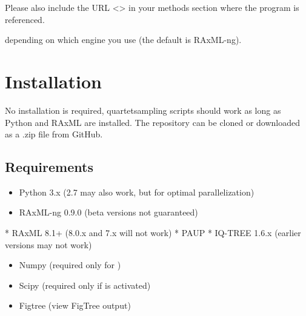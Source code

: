 \documentclass[letterpaper,12pt,english]{sphinxmanual}
\begin{document}
Please also include the URL \textless{}\textgreater{} in your methods section where the program is referenced.

 depending on which engine you use (the default is RAxML-ng).


\section{Installation}
\label{\detokenize{intro:installation}}
No installation is required, quartetsampling scripts should work as long as Python and RAxML are installed.  The repository can be cloned or downloaded as a .zip file from GitHub.


\subsection{Requirements}
\label{\detokenize{intro:requirements}}\begin{itemize}
\item {} 
Python 3.x (2.7 may also work, but  for optimal parallelization) 

\item {} 
RAxML-ng 0.9.0 (beta versions not guaranteed) 

\end{itemize}

* RAxML 8.1+ (8.0.x and 7.x will not work) 
* PAUP  
* IQ-TREE 1.6.x (earlier versions may not work) 

\begin{itemize}
\item {} 
Numpy  (required only for )

\item {} 
Scipy  (required only if  is activated)

\item {} 
Figtree  (view FigTree output)

\end{itemize}
\end{document}
